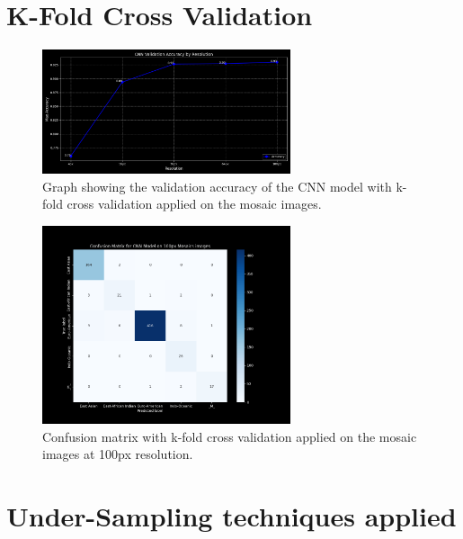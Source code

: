 \begin{appendices}
	\section{K-Fold Cross Validation}
	\label{app:kfold_cross_validation}

	\begin{figure}[H]
		\centering
		\includegraphics[width=0.65\textwidth]{../imgs/graphs/kfold/cnn_validation_accuracy_kfold_mosaics_line_mask_5_std.png}
		\caption{Graph showing the validation accuracy of the CNN model with k-fold cross validation applied on the mosaic images.}
		\label{fig:kfold_accuracy_mosaic}
	\end{figure}

	\begin{figure}[H]
		\centering
		\includegraphics[width=0.65\textwidth]{../imgs/graphs/kfold/cnn_confusion_matrix_kfold_mosaics_100px_mask_5_std.png}
		\caption{Confusion matrix with k-fold cross validation applied on the mosaic images at 100px resolution.}
		\label{fig:kfold_confusion_matrix_mosaic}
	\end{figure}

	\section{Under-Sampling techniques applied}
	\label{app:under_sampling}


\end{appendices}
